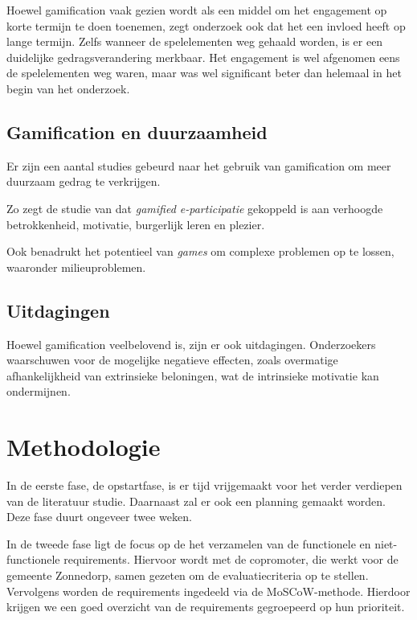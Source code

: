 \documentclass{hogent-article}
\begin{document}
Hoewel gamification vaak gezien wordt als een middel om het engagement op korte termijn te doen toenemen, zegt onderzoek ook dat het een invloed heeft op lange termijn. Zelfs wanneer de spelelementen weg gehaald worden, is er een duidelijke gedragsverandering merkbaar. Het engagement is wel afgenomen eens de spelelementen weg waren, maar was wel significant beter dan helemaal in het begin van het onderzoek. \autocite{Li_2024}

\subsection{Gamification en duurzaamheid}
Er zijn een aantal studies gebeurd naar het gebruik van gamification om meer duurzaam gedrag te verkrijgen. 

Zo zegt de studie van \textcite{Hassan_2020} dat \textit{gamified e-participatie} gekoppeld is aan verhoogde betrokkenheid, motivatie, burgerlijk leren en plezier.

Ook \textcite{McConigal2011} benadrukt het potentieel van \emph{games} om complexe problemen op te lossen, waaronder milieuproblemen.

\subsection{Uitdagingen}
Hoewel gamification veelbelovend is, zijn er ook uitdagingen. Onderzoekers waarschuwen voor de mogelijke negatieve effecten, zoals overmatige afhankelijkheid van extrinsieke beloningen, wat de intrinsieke motivatie kan ondermijnen. \autocite{Buznea2021}


\section{Methodologie}%
\label{sec:methodologie}

In de eerste fase, de opstartfase, is er tijd vrijgemaakt voor het verder verdiepen van de literatuur studie. Daarnaast zal er ook een planning gemaakt worden. Deze fase duurt ongeveer twee weken.

In de tweede fase ligt de focus op de het verzamelen van de functionele en niet-functionele requirements. Hiervoor wordt met de copromoter, die werkt voor de gemeente Zonnedorp, samen gezeten om de evaluatiecriteria op te stellen. Vervolgens worden de requirements ingedeeld via de MoSCoW-methode. Hierdoor krijgen we een goed overzicht van de requirements gegroepeerd op hun prioriteit.
\end{document}
